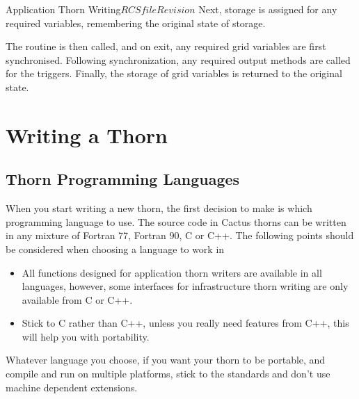 \begin{cactuspart}{Application Thorn Writing}{$RCSfile$}{$Revision$}
Next, storage is assigned for any required variables, remembering the
original state of storage.

The routine is then called, and on exit, any required grid variables are
first synchronised. Following synchronization, any required output methods
are called for the triggers. Finally, the storage of grid variables is
returned to the original state.


\chapter{Writing a Thorn}


\section{Thorn Programming Languages}

When you start writing a new thorn, the first decision to make is
which programming language to use. The source code in Cactus thorns
can be written in any mixture of Fortran 77, Fortran 90,
C or C++. The following points should be considered when
choosing a language to work in
\begin{itemize}

\item All functions designed for application thorn writers are available
      in all languages, however, some interfaces for infrastructure
      thorn writing are only available from C or C++.


\item Stick to C rather than C++, unless you really need
      features from C++, this will help you with portability.

\end{itemize}

Whatever language you choose, if you want your thorn to be portable, and
compile and run on multiple platforms, stick to the standards and don't
use machine dependent extensions.


\end{cactuspart}
